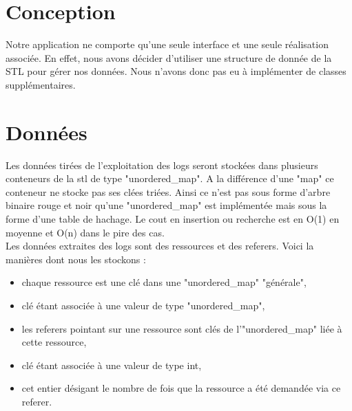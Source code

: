 \documentclass[a4paper]{article}
\begin{document}
\section{Conception}\noindent

	Notre application ne comporte qu'une seule interface et une seule réalisation associée. En effet, nous avons décider d'utiliser une structure de donnée de la STL pour gérer nos données. Nous n'avons donc pas eu à implémenter de classes supplémentaires.

\newpage
\section{Données}\noindent

Les données tirées de l'exploitation des logs seront stockées dans plusieurs conteneurs de la stl de type "unordered\_map". A la différence d'une "map" ce conteneur ne stocke pas ses clées triées. Ainsi ce n'est pas sous forme d'arbre binaire rouge et noir qu'une "unordered\_map" est implémentée mais sous la forme d'une table de hachage. Le cout en insertion ou recherche est en O(1) en moyenne et O(n) dans le pire des cas. 
\\
Les données extraites des logs sont des ressources et des referers. Voici la manières dont nous les stockons :
\begin{itemize}
\item chaque ressource est une clé dans une "unordered\_map" "générale",
\item clé étant associée à une valeur de type "unordered\_map",
\item les referers pointant sur une ressource sont clés de l'"unordered\_map" liée à cette ressource,
\item clé étant associée à une valeur de type int,
\item cet entier désigant le nombre de fois que la ressource a été demandée via ce referer.
\end{itemize}
\end{document}
